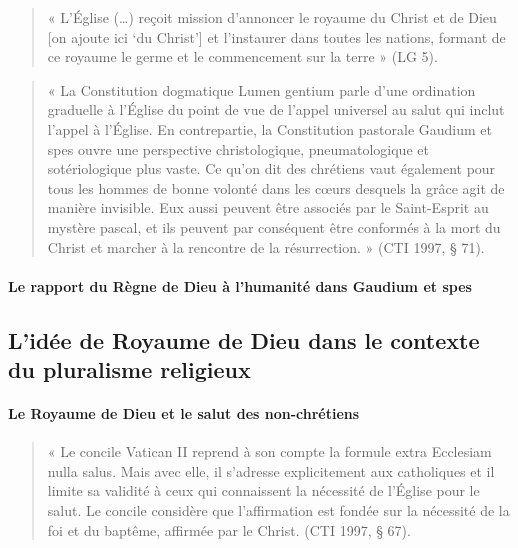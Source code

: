 \begin{quote}
    « L’Église (…) reçoit mission d’annoncer le royaume du Christ et de Dieu [on ajoute ici ‘du Christ’] et l’instaurer dans toutes les nations, formant de ce royaume le germe et le commencement sur la terre » (LG 5). 
\end{quote}

\begin{quote}
    «  La Constitution dogmatique Lumen gentium parle d’une ordination graduelle à l’Église du point de vue de l’appel universel au salut qui inclut l’appel à l’Église. En contrepartie, la Constitution pastorale Gaudium et spes ouvre une perspective christologique, pneumatologique et sotériologique plus vaste. Ce qu’on dit des chrétiens vaut également pour tous les hommes de bonne volonté dans les cœurs desquels la grâce agit de manière invisible. Eux aussi peuvent être associés par le Saint-Esprit au mystère pascal, et ils peuvent par conséquent être conformés à la mort du Christ et marcher à la rencontre de la résurrection. » (CTI 1997, § 71). 
\end{quote}
\paragraph{Le rapport du Règne de Dieu à l’humanité dans Gaudium et spes }



\subsection{L’idée de Royaume de Dieu dans le contexte du pluralisme religieux}
    \paragraph{Le Royaume de Dieu et le salut des non-chrétiens } 
    
    
\begin{quote}
    « Le concile Vatican II reprend à son compte la formule extra Ecclesiam nulla salus. Mais avec elle, il s’adresse explicitement aux catholiques et il limite sa validité à ceux qui connaissent la nécessité de l’Église pour le salut. Le concile considère que l’affirmation est fondée sur la nécessité de la foi et du baptême, affirmée par le Christ. (CTI 1997, § 67). 
\end{quote}

